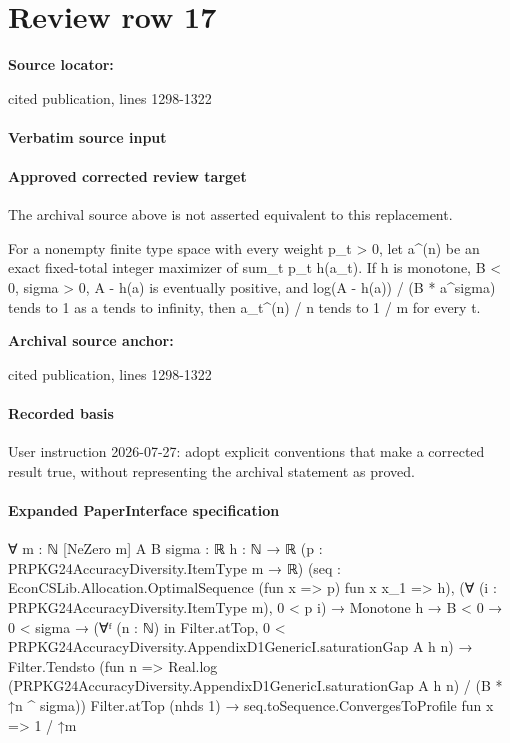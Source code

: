 \documentclass[10pt]{article}
\begin{document}
\section*{Review row 17}
\textbf{Source locator:} {\footnotesize\raggedright cited publication, lines 1298-\allowbreak{}1322\par}
\paragraph{Verbatim source input}
\begin{ReviewVerbatim}
\end{ReviewVerbatim}

\paragraph{Approved corrected review target}
The archival source above is not asserted equivalent to this replacement.
\begin{ReviewVerbatim}
For a nonempty finite type space with every weight p_t > 0, let a^(n) be an exact fixed-total integer maximizer of sum_t p_t h(a_t). If h is monotone, B < 0, sigma > 0, A - h(a) is eventually positive, and log(A - h(a)) / (B * a^sigma) tends to 1 as a tends to infinity, then a_t^(n) / n tends to 1 / m for every t.
\end{ReviewVerbatim}

\textbf{Archival source anchor:} {\footnotesize\raggedright cited publication, lines 1298-\allowbreak{}1322\par}
\paragraph{Recorded basis}
User instruction 2026-\allowbreak{}07-\allowbreak{}27:\allowbreak{} adopt explicit conventions that make a corrected result true, without representing the archival statement as proved.\allowbreak{}
\paragraph{Expanded PaperInterface specification}
\begin{ReviewVerbatim}
∀ {m : ℕ} [NeZero m] {A B sigma : ℝ} {h : ℕ → ℝ} (p : PRPKG24AccuracyDiversity.ItemType m → ℝ)
  (seq : EconCSLib.Allocation.OptimalSequence (fun x => p) fun x x_1 => h),
  (∀ (i : PRPKG24AccuracyDiversity.ItemType m), 0 < p i) →
    Monotone h →
      B < 0 →
        0 < sigma →
          (∀ᶠ (n : ℕ) in Filter.atTop, 0 < PRPKG24AccuracyDiversity.AppendixD1GenericI.saturationGap A h n) →
            Filter.Tendsto
                (fun n => Real.log (PRPKG24AccuracyDiversity.AppendixD1GenericI.saturationGap A h n) / (B * ↑n ^ sigma))
                Filter.atTop (nhds 1) →
              seq.toSequence.ConvergesToProfile fun x => 1 / ↑m
\end{ReviewVerbatim}
\end{document}
